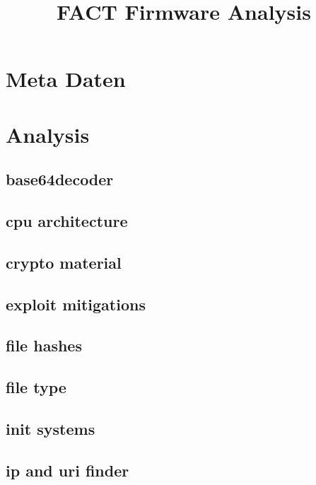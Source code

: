 \documentclass{article}
\begin{document}
\title{FACT Firmware Analysis}

\maketitle

\section{Meta Daten}


\section{Analysis}

\subsection{base64decoder}


\subsection{cpu architecture}


\subsection{crypto material}


\subsection{exploit mitigations}


\subsection{file hashes}


\subsection{file type}


\subsection{init systems}


\subsection{ip and uri finder}

\end{document}
